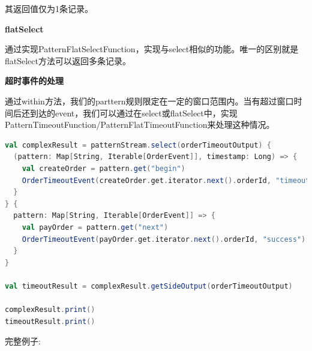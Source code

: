 \documentclass[oneside]{ctexbook}
\begin{document}
其返回值仅为1条记录。

\textbf{flatSelect}

通过实现PatternFlatSelectFunction，实现与select相似的功能。唯一的区别就是flatSelect方法可以返回多条记录。

\textbf{超时事件的处理}

通过within方法，我们的parttern规则限定在一定的窗口范围内。当有超过窗口时间后还到达的event，我们可以通过在select或flatSelect中，实现PatternTimeoutFunction/PatternFlatTimeoutFunction来处理这种情况。

\begin{lstlisting}[language=scala]
val complexResult = patternStream.select(orderTimeoutOutput) {
  (pattern: Map[String, Iterable[OrderEvent]], timestamp: Long) => {
    val createOrder = pattern.get("begin")
    OrderTimeoutEvent(createOrder.get.iterator.next().orderId, "timeout")
  }
} {
  pattern: Map[String, Iterable[OrderEvent]] => {
    val payOrder = pattern.get("next")
    OrderTimeoutEvent(payOrder.get.iterator.next().orderId, "success")
  }
}

val timeoutResult = complexResult.getSideOutput(orderTimeoutOutput)

complexResult.print()
timeoutResult.print()
\end{lstlisting}

完整例子:
\end{document}
